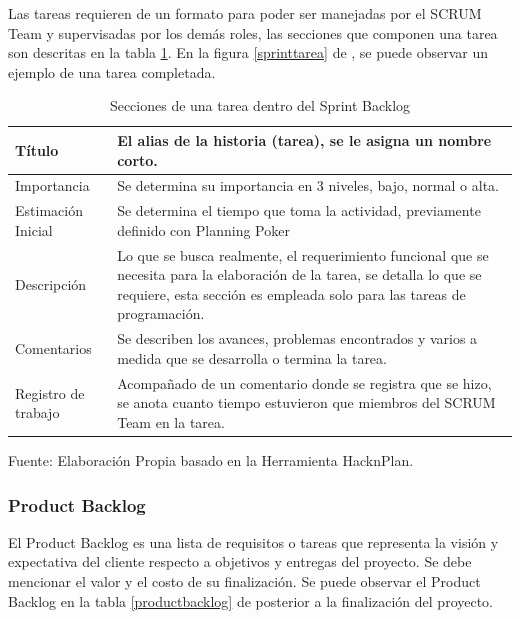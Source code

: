 Las tareas requieren de un formato para poder ser manejadas por el SCRUM Team y supervisadas por los demás roles, las secciones que componen una tarea son descritas en la tabla \ref{sprinttabla}. En la figura \ref{sprinttarea} de , se puede observar un ejemplo de una tarea completada.

\begin{table}[t!]
	\begin{center}
		\begin{tabular}{| m{4cm} | m{10cm} |  }
			\hline Título & El alias de la historia (tarea), se le asigna un nombre corto. \\ \hline
			 Importancia & Se determina su importancia en 3 niveles, bajo, normal o alta. \\ \hline
			 Estimación Inicial & Se determina el tiempo que toma la actividad, previamente definido con Planning Poker \\ \hline
			 Descripción & Lo que se busca realmente, el requerimiento funcional que se necesita para la elaboración de la tarea, se detalla lo que se requiere, esta sección es empleada solo para las tareas de programación. \\ \hline
			 Comentarios & Se describen los avances, problemas encontrados y varios a medida que se desarrolla o termina la tarea. \\ \hline
			Registro de trabajo  & Acompañado de un comentario donde se registra que se hizo, se anota cuanto tiempo estuvieron que miembros del SCRUM Team en la tarea. \\ \hline
		\end{tabular}
		\caption{Secciones de una tarea dentro del Sprint Backlog}
		\label{sprinttabla}
		\footnotesize Fuente: Elaboración Propia basado en la Herramienta HacknPlan.
	\end{center}
\end{table}

\subsubsection{Product Backlog}

El Product Backlog es una lista de requisitos o tareas que representa la visión y expectativa del cliente respecto a objetivos y entregas del proyecto. Se debe mencionar el valor y el costo de su finalización. Se puede observar el Product Backlog en la tabla \ref{productbacklog} de  posterior a la finalización del proyecto.


